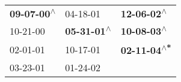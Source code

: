 \begin{supertabular}{lll}
 \textbf{09-07-00\textsuperscript{$\wedge$}} &                   04-18-01\textsuperscript{} &   \textbf{12-06-02\textsuperscript{$\wedge$}} \\
                  10-21-00\textsuperscript{} &  \textbf{05-31-01\textsuperscript{$\wedge$}} &   \textbf{10-08-03\textsuperscript{$\wedge$}} \\
                  02-01-01\textsuperscript{} &                   10-17-01\textsuperscript{} &  \textbf{02-11-04\textsuperscript{$\wedge$*}} \\
                  03-23-01\textsuperscript{} &                   01-24-02\textsuperscript{} &                                               \\
\end{supertabular}
